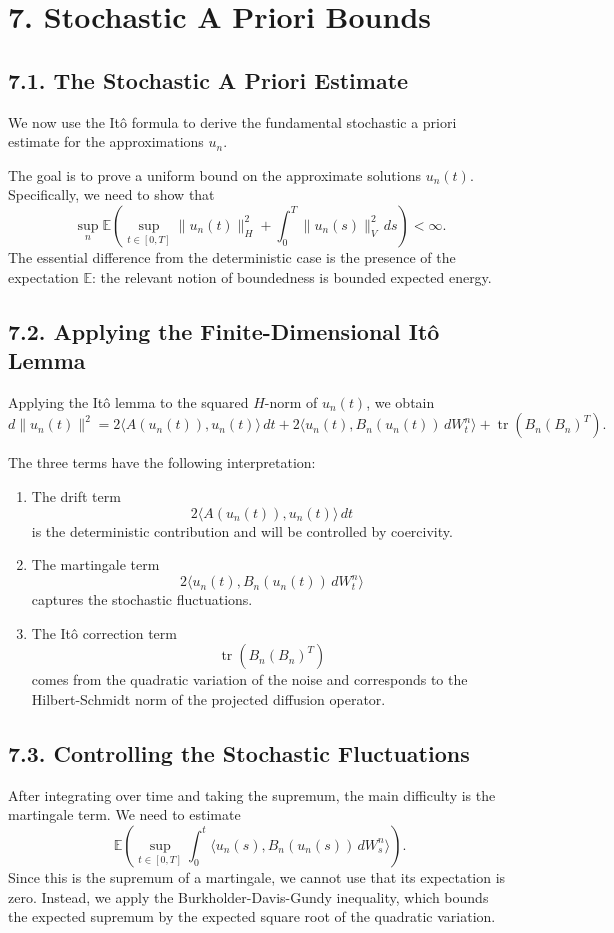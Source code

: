 \documentclass[11pt]{article}
\theoremstyle{definition}
\theoremstyle{remark}
\begin{document}
\section*{7. Stochastic A Priori Bounds}

\subsection*{7.1. The Stochastic A Priori Estimate}
We now use the It\^o formula to derive the fundamental stochastic a priori estimate for the approximations \(u_n\).

The goal is to prove a uniform bound on the approximate solutions \(u_n(t)\). Specifically, we need to show that
\[
\sup_n
\mathbb E\left(
\sup_{t\in[0,T]}\|u_n(t)\|_H^2
+
\int_0^T \|u_n(s)\|_V^2\,ds
\right)
<\infty.
\]
The essential difference from the deterministic case is the presence of the expectation \(\mathbb E\): the relevant notion of boundedness is bounded expected energy.

\subsection*{7.2. Applying the Finite-Dimensional It\^o Lemma}
Applying the It\^o lemma to the squared \(H\)-norm of \(u_n(t)\), we obtain
\[
d\|u_n(t)\|^2
=
2\langle A(u_n(t)),u_n(t)\rangle\,dt
+
2\langle u_n(t),B_n(u_n(t))\,dW_t^n\rangle
+
\operatorname{tr}(B_n(B_n)^T).
\]

The three terms have the following interpretation:

\begin{enumerate}
\item The drift term
\[
2\langle A(u_n(t)),u_n(t)\rangle\,dt
\]
is the deterministic contribution and will be controlled by coercivity.

\item The martingale term
\[
2\langle u_n(t),B_n(u_n(t))\,dW_t^n\rangle
\]
captures the stochastic fluctuations.

\item The It\^o correction term
\[
\operatorname{tr}(B_n(B_n)^T)
\]
comes from the quadratic variation of the noise and corresponds to the Hilbert-Schmidt norm of the projected diffusion operator.
\end{enumerate}

\subsection*{7.3. Controlling the Stochastic Fluctuations}
After integrating over time and taking the supremum, the main difficulty is the martingale term. We need to estimate
\[
\mathbb E\left(
\sup_{t\in[0,T]}
\int_0^t \langle u_n(s),B_n(u_n(s))\,dW_s^n\rangle
\right).
\]
Since this is the supremum of a martingale, we cannot use that its expectation is zero. Instead, we apply the Burkholder-Davis-Gundy inequality, which bounds the expected supremum by the expected square root of the quadratic variation.
\end{document}
